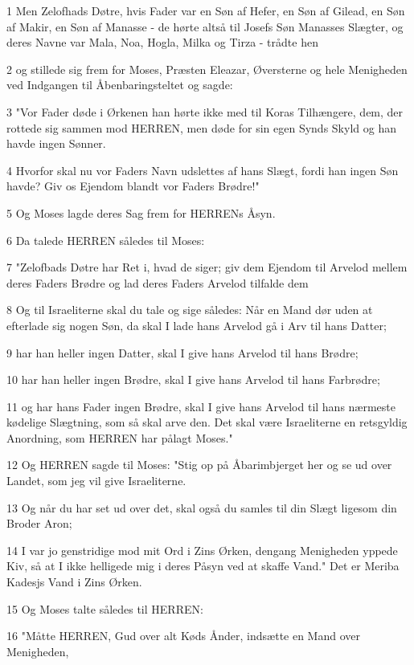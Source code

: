 \par 1 Men Zelofhads Døtre, hvis Fader var en Søn af Hefer, en Søn af Gilead, en Søn af Makir, en Søn af Manasse - de hørte altså til Josefs Søn Manasses Slægter, og deres Navne var Mala, Noa, Hogla, Milka og Tirza - trådte hen
\par 2 og stillede sig frem for Moses, Præsten Eleazar, Øversterne og hele Menigheden ved Indgangen til Åbenbaringsteltet og sagde:
\par 3 "Vor Fader døde i Ørkenen han hørte ikke med til Koras Tilhængere, dem, der rottede sig sammen mod HERREN, men døde for sin egen Synds Skyld og han havde ingen Sønner.
\par 4 Hvorfor skal nu vor Faders Navn udslettes af hans Slægt, fordi han ingen Søn havde? Giv os Ejendom blandt vor Faders Brødre!"
\par 5 Og Moses lagde deres Sag frem for HERRENs Åsyn.
\par 6 Da talede HERREN således til Moses:
\par 7 "Zelofbads Døtre har Ret i, hvad de siger; giv dem Ejendom til Arvelod mellem deres Faders Brødre og lad deres Faders Arvelod tilfalde dem
\par 8 Og til Israeliterne skal du tale og sige således: Når en Mand dør uden at efterlade sig nogen Søn, da skal I lade hans Arvelod gå i Arv til hans Datter;
\par 9 har han heller ingen Datter, skal I give hans Arvelod til hans Brødre;
\par 10 har han heller ingen Brødre, skal I give hans Arvelod til hans Farbrødre;
\par 11 og har hans Fader ingen Brødre, skal I give hans Arvelod til hans nærmeste kødelige Slægtning, som så skal arve den. Det skal være Israeliterne en retsgyldig Anordning, som HERREN har pålagt Moses."
\par 12 Og HERREN sagde til Moses: "Stig op på Åbarimbjerget her og se ud over Landet, som jeg vil give Israeliterne.
\par 13 Og når du har set ud over det, skal også du samles til din Slægt ligesom din Broder Aron;
\par 14 I var jo genstridige mod mit Ord i Zins Ørken, dengang Menigheden yppede Kiv, så at I ikke helligede mig i deres Påsyn ved at skaffe Vand." Det er Meriba Kadesjs Vand i Zins Ørken.
\par 15 Og Moses talte således til HERREN:
\par 16 "Måtte HERREN, Gud over alt Køds Ånder, indsætte en Mand over Menigheden,
